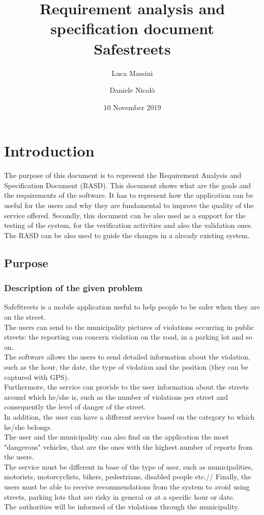 \documentclass[titlepage]{article}
\author{Luca Massini \and Daniele Nicolò}
\title{Requirement analysis and specification document
\\  Safestreets}
\date{10 November 2019}
\begin{document}
\maketitle
\newpage 
\tableofcontents
\newpage

\section{Introduction}
The purpose of this document is to represent the Requirement Analysis and Specification Document (RASD).
This document shows what are the goals and the requirements of the software.
It has to represent how the application can be useful for the users and why they are fundamental to improve the quality of the service offered. Secondly, this document can be also used as a support for the testing of the system, for the verification activities and also the validation ones. The RASD can be also used to guide the changes in a already existing system.
\subsection{Purpose}

\subsubsection{Description of the given problem}
SafeStreets is a mobile application useful to help people to be safer when they are on the street.\\
The users can send to the municipality pictures of violations occurring in public streets: the reporting can concern violation on the road, in a parking lot and so on.\\
The software allows the users to send detailed information about the violation, such as the hour, the date, the type of violation and the position (they can be captured with GPS).\\
Furthermore, the service can provide to the user information about the streets around which he/she is,
such as the number of violations per street and consequently the level of danger of the street.\\
In addition, the user can have a different service based on the category to which he/she belongs.\\
The user and the municipality can also find on the application the most "dangerous" vehicles, that are the ones with the highest number of reports from the users.\\
The service must be different in base of the type of user, such as municipalities, motorists, motorcyclists, bikers, pedestrians, disabled people etc.//
Finally, the users must be able to receive recommendations from the system to avoid using streets, parking lots that are risky in general or at a specific hour or date.\\
The authorities will be informed of the violations through the municipality.
\end{document}
